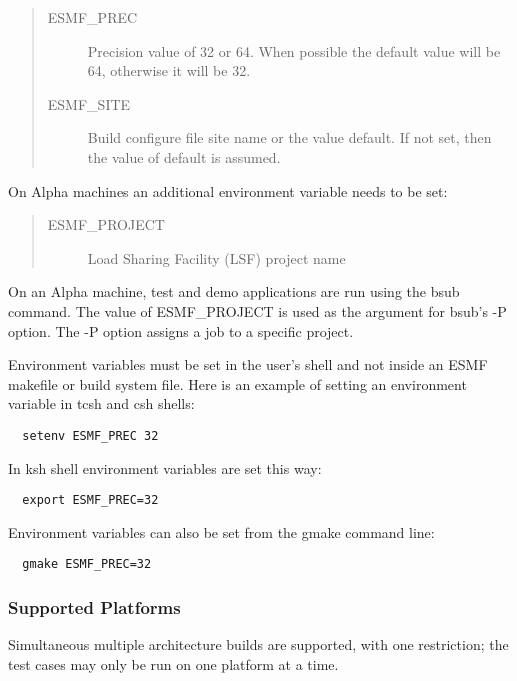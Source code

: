 \begin{quote}
\begin{description}
  \item[ESMF\_PREC] Precision value of 32 or 64.  When possible the
                 default value will be 64, otherwise it will be 32.

  \item[ESMF\_SITE] Build configure file site name or the value default.  
                 If not set, then the value of default is assumed.


\end{description}
\end{quote}

On Alpha machines an additional environment variable needs
to be set:

\begin{quote}
\begin{description}
  \item[ESMF\_PROJECT] Load Sharing Facility (LSF) project name
\end{description}
\end{quote}

On an Alpha machine, test and demo applications are run using 
the bsub command.  The value of ESMF\_PROJECT is used as the 
argument for bsub's -P option. The -P option assigns a job to 
a specific project.  

Environment variables must be set in the user's shell and not
inside an ESMF makefile or build system file.  Here is an example 
of setting an environment variable in tcsh and csh shells:

\begin{verbatim}
  setenv ESMF_PREC 32
\end{verbatim}

In ksh shell environment variables are set this way:

\begin{verbatim}
  export ESMF_PREC=32
\end{verbatim}

Environment variables can also be set from the gmake command line:

\begin{verbatim}
  gmake ESMF_PREC=32
\end{verbatim}

\subsubsection{Supported Platforms}


Simultaneous multiple architecture builds are supported, with
one restriction; the test cases may only be run on one platform at a time. 

